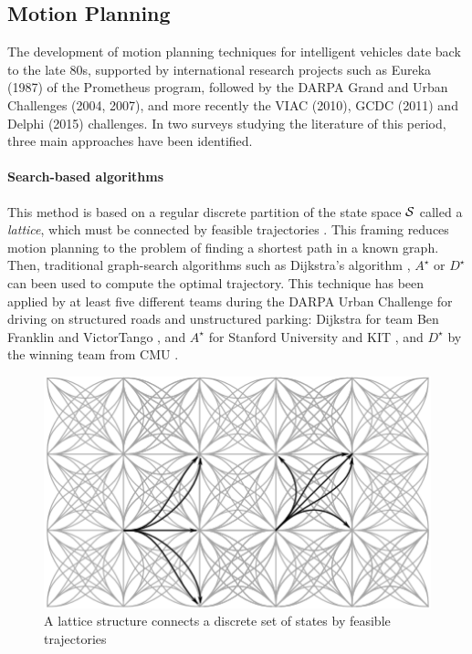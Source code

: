 \subsection{Motion Planning}

The development of motion planning techniques for intelligent vehicles date back to the late 80s, supported by international research projects such as Eureka (1987) of the Prometheus program, followed by the DARPA Grand and Urban Challenges (2004, 2007), and more recently the VIAC (2010), GCDC (2011) and Delphi (2015) challenges. In two surveys \citep{Gonzalez2016,Paden2016} studying the literature of this period, three main approaches have been identified.

\paragraph{Search-based algorithms}

This method is based on a regular discrete partition of the state space $\mathcal{S}$ called a \emph{lattice}, which must be connected by feasible trajectories \citep[\eg][]{Pivtoraiko2005}. This framing reduces motion planning to the problem of finding a shortest path in a known graph. Then, traditional graph-search algorithms such as Dijkstra's algorithm \citep{Dijkstra1959}, $A^\star$ \citep{Hart1968} or $D^\star$ \citep{Stentz1994} can been used to compute the optimal trajectory. This technique has been applied by at least five different teams during the DARPA Urban Challenge for driving on structured roads and unstructured parking: Dijkstra for team Ben Franklin \citep{Bohren2008} and VictorTango \citep{Bacha2008}, and $A^\star$ for Stanford University \citep{Montemerlo2008} and KIT \citep{Kammel2008}, and $D^\star$ by the winning team from CMU \citep{Urmson2008}.

\begin{figure}[tp]
	\centering
	\includegraphics[width=0.5\linewidth]{img/lattice2}
	\caption{A lattice structure connects a discrete set of states by feasible trajectories}
\end{figure}

